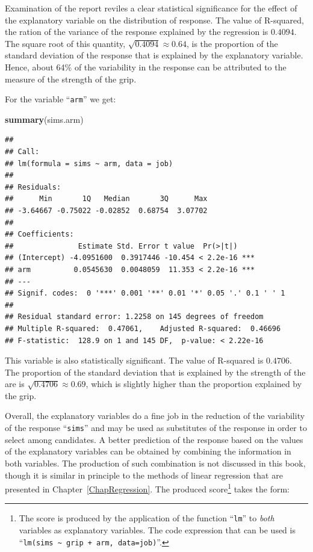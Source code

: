 \documentclass[]{krantz}
\makeatletter
\newenvironment{Shaded}{\begin{snugshade}}{\end{snugshade}}
\newcommand{\KeywordTok}[1]{\textcolor[rgb]{0.13,0.29,0.53}{\textbf{#1}}}
\newcommand{\NormalTok}[1]{#1}
\newenvironment{kframe}{%
\medskip{}
\setlength{\fboxsep}{.8em}
 \def\at@end@of@kframe{}%
 \ifinner\ifhmode%
  \def\at@end@of@kframe{\end{minipage}}%
  \begin{minipage}{\columnwidth}%
 \fi\fi%
 \def\FrameCommand##1{\hskip\@totalleftmargin \hskip-\fboxsep
 \colorbox{shadecolor}{##1}\hskip-\fboxsep
     \hskip-\linewidth \hskip-\@totalleftmargin \hskip\columnwidth}%
 \MakeFramed {\advance\hsize-\width
   \@totalleftmargin\z@ \linewidth\hsize
   \@setminipage}}%
 {\par\unskip\endMakeFramed%
 \at@end@of@kframe}
\renewenvironment{Shaded}{\begin{kframe}}{\end{kframe}}
\theoremstyle{definition}
\theoremstyle{definition}
\theoremstyle{definition}
\theoremstyle{remark}
\makeatother
\begin{document}
Examination of the report reviles a clear statistical significance for
the effect of the explanatory variable on the distribution of response.
The value of R-squared, the ration of the variance of the response
explained by the regression is \(0.4094\). The square root of this
quantity, \(\sqrt{0.4094} \approx 0.64\), is the proportion of the
standard deviation of the response that is explained by the explanatory
variable. Hence, about 64\% of the variability in the response can be
attributed to the measure of the strength of the grip.

For the variable ``\texttt{arm}'' we get:

\begin{Shaded}
\begin{Highlighting}[]
\KeywordTok{summary}\NormalTok{(sims.arm)}
\end{Highlighting}
\end{Shaded}

\begin{verbatim}
## 
## Call:
## lm(formula = sims ~ arm, data = job)
## 
## Residuals:
##      Min       1Q   Median       3Q      Max 
## -3.64667 -0.75022 -0.02852  0.68754  3.07702 
## 
## Coefficients:
##               Estimate Std. Error t value  Pr(>|t|)    
## (Intercept) -4.0951600  0.3917446 -10.454 < 2.2e-16 ***
## arm          0.0545630  0.0048059  11.353 < 2.2e-16 ***
## ---
## Signif. codes:  0 '***' 0.001 '**' 0.01 '*' 0.05 '.' 0.1 ' ' 1
## 
## Residual standard error: 1.2258 on 145 degrees of freedom
## Multiple R-squared:  0.47061,    Adjusted R-squared:  0.46696 
## F-statistic:  128.9 on 1 and 145 DF,  p-value: < 2.22e-16
\end{verbatim}

This variable is also statistically significant. The value of R-squared
is \(0.4706\). The proportion of the standard deviation that is
explained by the strength of the are is \(\sqrt{0.4706} \approx 0.69\),
which is slightly higher than the proportion explained by the grip.

Overall, the explanatory variables do a fine job in the reduction of the
variability of the response ``\texttt{sims}'' and may be used as
substitutes of the response in order to select among candidates. A
better prediction of the response based on the values of the explanatory
variables can be obtained by combining the information in both
variables. The production of such combination is not discussed in this
book, though it is similar in principle to the methods of linear
regression that are presented in Chapter~\ref{ChapRegression}. The
produced score\footnote{The score is produced by the application of the
  function ``\texttt{lm}'' to \emph{both} variables as explanatory
  variables. The code expression that can be used is
  ``\texttt{lm(sims\ \textasciitilde{}\ grip\ +\ arm,\ data=job)}''.}
takes the form:
\end{document}
